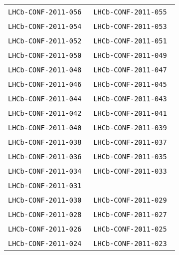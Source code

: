 \begin{center}
\begin{longtable}{ll}
\texttt{LHCb-CONF-2011-056}~\cite{LHCb-CONF-2011-056} & 
\texttt{LHCb-CONF-2011-055}~\cite{LHCb-CONF-2011-055} \\ 
\texttt{LHCb-CONF-2011-054}~\cite{LHCb-CONF-2011-054} &
\texttt{LHCb-CONF-2011-053}~\cite{LHCb-CONF-2011-053} \\ 
\texttt{LHCb-CONF-2011-052}~\cite{LHCb-CONF-2011-052} &
\texttt{LHCb-CONF-2011-051}~\cite{LHCb-CONF-2011-051} \\ 
\texttt{LHCb-CONF-2011-050}~\cite{LHCb-CONF-2011-050} &
\texttt{LHCb-CONF-2011-049}~\cite{LHCb-CONF-2011-049} \\
\texttt{LHCb-CONF-2011-048}~\cite{LHCb-CONF-2011-048} & 
\texttt{LHCb-CONF-2011-047}~\cite{LHCb-CONF-2011-047} \\
\texttt{LHCb-CONF-2011-046}~\cite{LHCb-CONF-2011-046} & 
\texttt{LHCb-CONF-2011-045}~\cite{LHCb-CONF-2011-045} \\ 
\texttt{LHCb-CONF-2011-044}~\cite{LHCb-CONF-2011-044} &
\texttt{LHCb-CONF-2011-043}~\cite{LHCb-CONF-2011-043} \\ 
\texttt{LHCb-CONF-2011-042}~\cite{LHCb-CONF-2011-042} &
\texttt{LHCb-CONF-2011-041}~\cite{LHCb-CONF-2011-041} \\ 
\texttt{LHCb-CONF-2011-040}~\cite{LHCb-CONF-2011-040} &
\texttt{LHCb-CONF-2011-039}~\cite{LHCb-CONF-2011-039} \\
\texttt{LHCb-CONF-2011-038}~\cite{LHCb-CONF-2011-038} &
\texttt{LHCb-CONF-2011-037}~\cite{LHCb-CONF-2011-037} \\
\texttt{LHCb-CONF-2011-036}~\cite{LHCb-CONF-2011-036} &
\texttt{LHCb-CONF-2011-035}~\cite{LHCb-CONF-2011-035} \\
\texttt{LHCb-CONF-2011-034}~\cite{LHCb-CONF-2011-034} &
\texttt{LHCb-CONF-2011-033}~\cite{LHCb-CONF-2011-033} \\
\texttt{LHCb-CONF-2011-031}~\cite{LHCb-CONF-2011-031} \\
\texttt{LHCb-CONF-2011-030}~\cite{LHCb-CONF-2011-030} &
\texttt{LHCb-CONF-2011-029}~\cite{LHCb-CONF-2011-029} \\
\texttt{LHCb-CONF-2011-028}~\cite{LHCb-CONF-2011-028} &
\texttt{LHCb-CONF-2011-027}~\cite{LHCb-CONF-2011-027} \\
\texttt{LHCb-CONF-2011-026}~\cite{LHCb-CONF-2011-026} &
\texttt{LHCb-CONF-2011-025}~\cite{LHCb-CONF-2011-025} \\
\texttt{LHCb-CONF-2011-024}~\cite{LHCb-CONF-2011-024} &
\texttt{LHCb-CONF-2011-023}~\cite{LHCb-CONF-2011-023} \\

\end{longtable}
\end{center}
